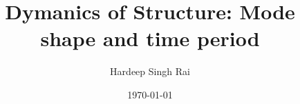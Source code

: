 \title{Dymanics of Structure: Mode shape and time period}

\author{Hardeep Singh Rai}

\date{\today}

\maketitle

